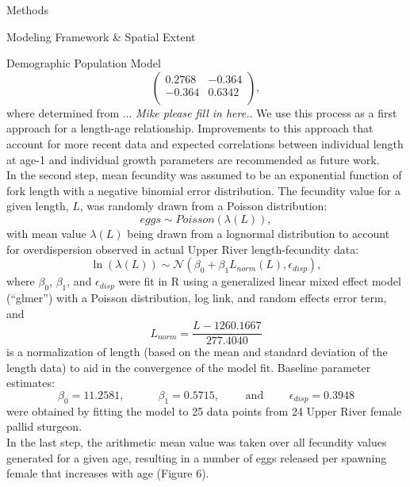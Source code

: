 \documentclass[12pt]{article}
\begin{document}
\begin{section}{Methods}
\begin{subsection}{Modeling Framework \& Spatial Extent}
\begin{subsubsection}{Demographic Population Model}
\begin{equation}
\begin{pmatrix}
0.2768 & -0.364\\
-0.364 & 0.6342\\
\end{pmatrix},
\end{equation}
 where determined from ... \textit{Mike please fill in here.}.  We use this process as a first approach for a length-age relationship.  Improvements to this approach that account for more recent data and expected correlations between individual length at age-1 and individual growth parameters are recommended as future work.\\ 

In the second step, mean fecundity was assumed to be an exponential function of fork length with a negative binomial error distribution.  The fecundity value for a given length, $L$, was randomly drawn from a Poisson distribution:
\begin{equation}
eggs \sim Poisson(\lambda(L)),
\end{equation}
with mean value $\lambda(L)$ being drawn from a lognormal distribution to account for overdispersion observed in actual Upper River length-fecundity data:
\begin{equation}
\ln(\lambda(L)) \sim \mathcal{N}(\beta_0 + \beta_1 L_{norm}(L), \epsilon_{disp}),
\end{equation}
where $\beta_0$, $\beta_1$, and $\epsilon_{disp}$ were fit in R using a generalized linear mixed effect model (``glmer'') with a Poisson distribution, log link, and random effects error term, and
\begin{equation}
L_{norm}=\frac{L-1260.1667}{277.4040}
\end{equation}
is a normalization of length (based on the mean and standard deviation of the length data) to aid in the convergence of the model fit.  Baseline parameter estimates:
\begin{equation}
\beta_0=11.2581,   \hspace{36pt} \beta_1=0.5715, \hspace{24pt} \mbox{ and } \hspace{24pt} \epsilon_{disp}=0.3948
\end{equation}
were obtained by fitting the model to 25 data points from 24 Upper River female pallid sturgeon. \\ 

In the last step, the arithmetic mean value was taken over all fecundity values generated for a given age, resulting in a number of eggs released per spawning female that increases with age (Figure 6).



\end{subsubsection}
\end{subsection}
\end{section}
\end{document}
